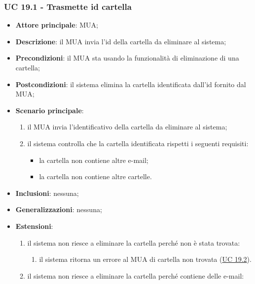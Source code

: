 \subsubsection{UC 19.1 - Trasmette id cartella} \label{sec:UC19.1}
    \begin{itemize}
        \item \textbf{Attore principale}: MUA;
        \item \textbf{Descrizione}: il MUA invia l'id della cartella da eliminare al sistema;
        \item \textbf{Precondizioni}: il MUA sta usando la funzionalità di eliminazione di una cartella;
        \item \textbf{Postcondizioni}: il sistema elimina la cartella identificata dall'id fornito dal MUA;
        \item \textbf{Scenario principale}:
            \begin{enumerate}
                \item il MUA invia l'identificativo della cartella da eliminare al sistema;
                \item il sistema controlla che la cartella identificata rispetti i seguenti requisiti:
                \begin{itemize}
                    \item la cartella non contiene altre e-mail;
                    \item la cartella non contiene altre cartelle.
                \end{itemize}
            \end{enumerate}
        \item \textbf{Inclusioni}: nessuna;
        \item \textbf{Generalizzazioni}: nessuna;
        \item \textbf{Estensioni}:
            \begin{enumerate}[label=\alph*.]
                \item il sistema non riesce a eliminare la cartella perché non è stata trovata:
                \begin{enumerate}[label=\arabic*.]
                    \item il sistema ritorna un errore al MUA di cartella non trovata (\hyperref[sec:UC19.2]{UC 19.2}).
                \end{enumerate}
                \item il sistema non riesce a eliminare la cartella perché contiene delle e-mail:
                \begin{enumerate}[label=\arabic*.]

\end{enumerate}
\end{enumerate}
\end{itemize}
